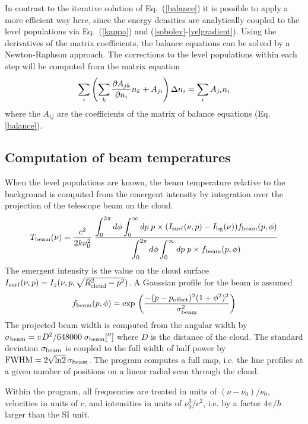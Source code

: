 In contrast to the iterative solution of Eq.\ (\ref{balance}) it is possible
to apply a more efficient way here, since the energy densities are
analytically coupled to the level populations via Eq.\ (\ref{kappa}) and
(\ref{sobolev}-\ref{velgradient}). Using the derivatives of the matrix 
coefficients, the balance equations can be solved by a Newton-Raphson
approach. The corrections to the level populations within each step
will be computed from the matrix equation
\begin{equation}
\sum_i\left(\sum_k {\partial A_{jk} \over \partial n_i}n_k+A_{ji}\right)
\Delta n_i = \sum_i A_{ji} n_i
\label{diffbalance}
\end{equation}
where the $A_{ij}$ are the coefficients of the matrix of balance equations
(Eq. \ref{balance}).

\subsection{Computation of beam temperatures}

When the level populations are known, the beam temperature relative 
to the background is computed from the emergent intensity
by integration over the projection of the telescope beam on the
cloud.
\begin{equation}
T_{\rm beam}(\nu)={c^2 \over 2 k \nu_0^2} \;{\displaystyle \int_0^{2\pi} d\phi
\int_0^\infty dp \;p\times (I_{\rm surf}(\nu,p)-I_{\rm bg}(\nu) )
f_{\rm beam}(p,\phi) \over \displaystyle
\int_0^{2\pi} d\phi \int_0^\infty dp\;
p\times f_{\rm beam}(p,\phi)}
\label{beam}
\end{equation}
The emergent intensity is the value on the cloud
surface $I_{\rm surf}(\nu,p)=I_z(\nu,p,\sqrt{R_{\rm cloud}^2-p^2})$.
A Gaussian profile for the beam is assumed
\begin{equation}
f_{\rm beam}(p,\phi)= 
\exp{}\left(-(p-p_{\rm offset})^2(1+\phi^2)^2 \over \sigma_{\rm beam}^2\right)
\end{equation}
The projected beam width is computed from the angular
width by $\sigma_{\rm beam} = \pi D^2/648000\; \sigma_{\rm beam}['']$
where $D$ is the distance of the cloud. The standard deviation
$\sigma_{\rm beam}$ is coupled to the full width of half power
by ${\rm FWHM}=2\sqrt{{\rm ln}2}\,\sigma_{\rm beam}$. The program
computes a full map, i.e. the line profiles
at a given number of positions on a linear radial scan through
the cloud.

Within the program, all frequencies are treated in units of
$(\nu-\nu_0)/\nu_0$, velocities in units of $c$, and 
intensities in units of $\nu_0^3/c^2$, i.e. by a factor
$4\pi/h$ larger than the SI unit.

